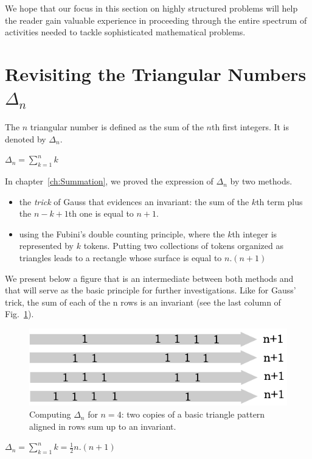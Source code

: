 \smallskip

We hope that our focus in this section on highly structured problems will help the reader gain valuable experience in proceeding through the entire spectrum of activities needed to tackle sophisticated mathematical problems.


\section{Revisiting the Triangular Numbers $\Delta_n$}

The $n$ triangular number is defined as the sum of the $n$th first integers.
It is denoted by $\Delta_n$.

$\Delta_n =  \sum_{k=1}^{n} k$

In chapter~\ref{ch:Summation}, we proved the expression of $\Delta_n$ by two methods.
\begin{itemize}
\item the \textit{trick} of Gauss that evidences an invariant: the sum of the $k$th term plus the $n-k+1$th one
is equal to $n+1$. 
\item using the Fubini's double counting principle, where the $k$th integer is represented by $k$ tokens.
Putting two collections of tokens organized as triangles leads to a rectangle whose surface is equal to $n.(n+1)$
\end{itemize}
We present below a figure that is an intermediate between both methods and that will serve as the basic principle for further investigations.
Like for Gauss' trick, the sum of each of the n rows is an invariant (see the last column of Fig.~\ref{fig:Tetrahedral2}). 
\begin{figure}[h]
\begin{center}
        \includegraphics[scale=0.4]{FiguresArithmetic/appTetrahedral2}
        \caption{Computing $\Delta_n$ for $n=4$: two copies of a basic triangle pattern aligned in rows sum up to an invariant.}
        \label{fig:Tetrahedral2}
\end{center}
\end{figure}
$\Delta_n =  \sum_{k=1}^{n} k = \frac{1}{2}n.(n+1)$


